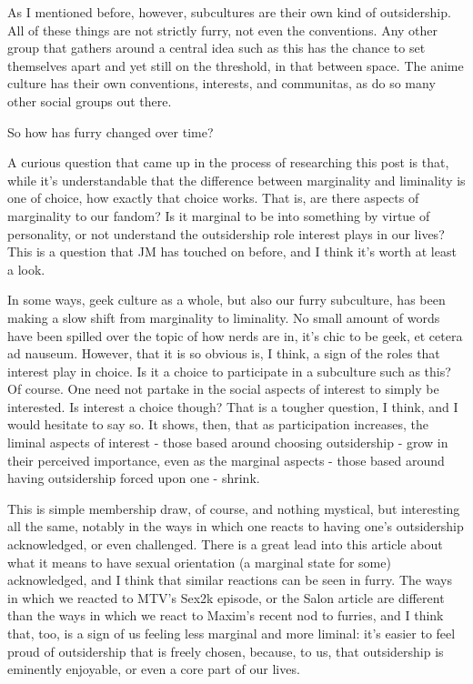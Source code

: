 As I mentioned before, however, subcultures are their own kind of outsidership. All of these things are not strictly furry, not even the conventions. Any other group that gathers around a central idea such as this has the chance to set themselves apart and yet still on the threshold, in that between space. The anime culture has their own conventions, interests, and communitas, as do so many other social groups out there.

So how has furry changed over time?

A curious question that came up in the process of researching this post is that, while it's understandable that the difference between marginality and liminality is one of choice, how exactly that choice works. That is, are there aspects of marginality to our fandom? Is it marginal to be into something by virtue of personality, or not understand the outsidership role interest plays in our lives? This is a question that JM has touched on before, and I think it's worth at least a look.

In some ways, geek culture as a whole, but also our furry subculture, has been making a slow shift from marginality to liminality. No small amount of words have been spilled over the topic of how nerds are in, it's chic to be geek, et cetera ad nauseum. However, that it is so obvious is, I think, a sign of the roles that interest play in choice. Is it a choice to participate in a subculture such as this? Of course. One need not partake in the social aspects of interest to simply be interested. Is interest a choice though? That is a tougher question, I think, and I would hesitate to say so. It shows, then, that as participation increases, the liminal aspects of interest - those based around choosing outsidership - grow in their perceived importance, even as the marginal aspects - those based around having outsidership forced upon one - shrink.

This is simple membership draw, of course, and nothing mystical, but interesting all the same, notably in the ways in which one reacts to having one's outsidership acknowledged, or even challenged. There is a great lead into this article about what it means to have sexual orientation (a marginal state for some) acknowledged, and I think that similar reactions can be seen in furry. The ways in which we reacted to MTV's Sex2k episode, or the Salon article are different than the ways in which we react to Maxim's recent nod to furries, and I think that, too, is a sign of us feeling less marginal and more liminal: it's easier to feel proud of outsidership that is freely chosen, because, to us, that outsidership is eminently enjoyable, or even a core part of our lives.


